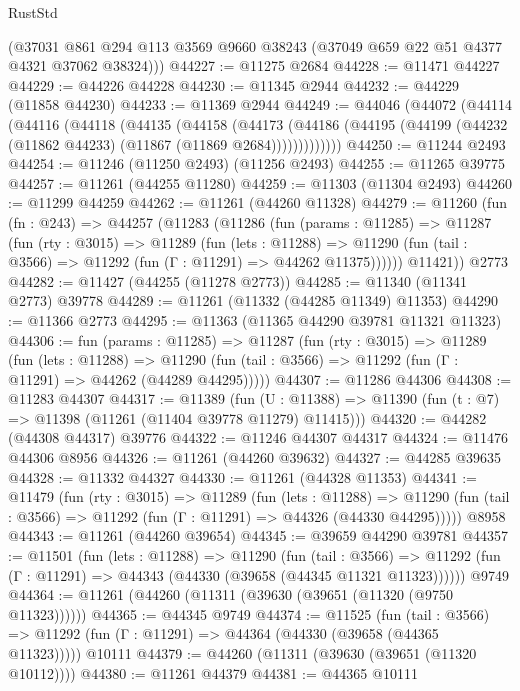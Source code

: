 \begin{lexlean}{RustStd}
\begin{coremodule}
      (@37031 @861 @294 @113 @3569 @9660 @38243 (@37049 @659 @22 @51 @4377 @4321 @37062 @38324)))
@44227 := @11275 @2684
@44228 := @11471 @44227
@44229 := @44226 @44228
@44230 := @11345 @2944
@44232 := @44229 (@11858 @44230)
@44233 := @11369 @2944
@44249 := @44046
    (@44072
      (@44114
        (@44116
          (@44118
            (@44135
              (@44158
                (@44173
                  (@44186 (@44195 (@44199 (@44232 (@11862 @44233) (@11867 (@11869 @2684)))))))))))))
@44250 := @11244 @2493
@44254 := @11246 (@11250 @2493) (@11256 @2493)
@44255 := @11265 @39775
@44257 := @11261 (@44255 @11280)
@44259 := @11303 (@11304 @2493)
@44260 := @11299 @44259
@44262 := @11261 (@44260 @11328)
@44279 := @11260
    (fun (fn : @243) =>
    @44257
      (@11283
        (@11286
          (fun (params : @11285) =>
          @11287
            (fun (rty : @3015) =>
            @11289
              (fun (lets : @11288) =>
              @11290 (fun (tail : @3566) => @11292 (fun (Γ : @11291) => @44262 @11375))))))
        @11421))
    @2773
@44282 := @11427 (@44255 (@11278 @2773))
@44285 := @11340 (@11341 @2773) @39778
@44289 := @11261 (@11332 (@44285 @11349) @11353)
@44290 := @11366 @2773
@44295 := @11363 (@11365 @44290 @39781 @11321 @11323)
@44306 := fun (params : @11285) =>
  @11287
    (fun (rty : @3015) =>
    @11289
      (fun (lets : @11288) =>
      @11290 (fun (tail : @3566) => @11292 (fun (Γ : @11291) => @44262 (@44289 @44295)))))
@44307 := @11286 @44306
@44308 := @11283 @44307
@44317 := @11389
    (fun (U : @11388) => @11390 (fun (t : @7) => @11398 (@11261 (@11404 @39778 @11279) @11415)))
@44320 := @44282 (@44308 @44317) @39776
@44322 := @11246 @44307 @44317
@44324 := @11476 @44306 @8956
@44326 := @11261 (@44260 @39632)
@44327 := @44285 @39635
@44328 := @11332 @44327
@44330 := @11261 (@44328 @11353)
@44341 := @11479
    (fun (rty : @3015) =>
    @11289
      (fun (lets : @11288) =>
      @11290 (fun (tail : @3566) => @11292 (fun (Γ : @11291) => @44326 (@44330 @44295)))))
    @8958
@44343 := @11261 (@44260 @39654)
@44345 := @39659 @44290 @39781
@44357 := @11501
    (fun (lets : @11288) =>
    @11290
      (fun (tail : @3566) =>
      @11292 (fun (Γ : @11291) => @44343 (@44330 (@39658 (@44345 @11321 @11323))))))
    @9749
@44364 := @11261 (@44260 (@11311 (@39630 (@39651 (@11320 (@9750 @11323))))))
@44365 := @44345 @9749
@44374 := @11525
    (fun (tail : @3566) => @11292 (fun (Γ : @11291) => @44364 (@44330 (@39658 (@44365 @11323)))))
    @10111
@44379 := @44260 (@11311 (@39630 (@39651 (@11320 @10112))))
@44380 := @11261 @44379
@44381 := @44365 @10111

\end{coremodule}
\end{lexlean}
